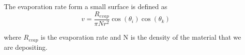 The evaporation rate form a small surface is defined as 
\begin{equation}
v=\frac{R_{evap}}{\pi N r^2}\cos(\theta_i )\cos(\theta_k)
\end{equation}

where $R_{evap}$ is the evaporation rate and N is the density of the material that we are depositing.\\


























